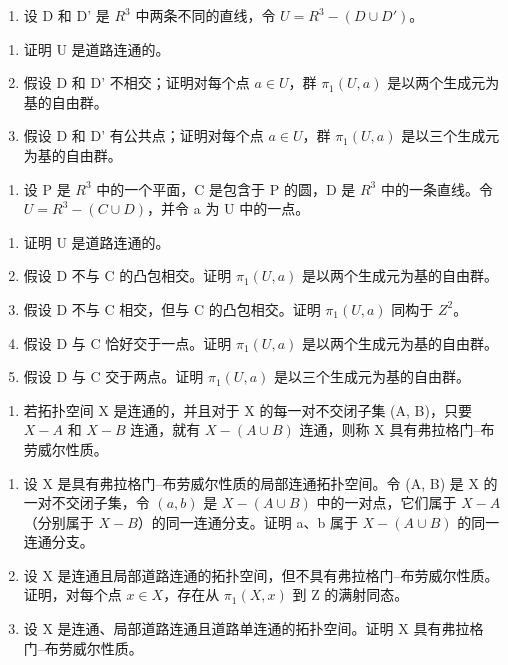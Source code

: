 \begin{enumerate}
\def\labelenumi{\arabic{enumi})}
\setcounter{enumi}{12}
\tightlist
\item
    设 D 和 D' 是 \(R^{3}\) 中两条不同的直线，令 \(U = R^{3} - (D \cup D')\)。
\end{enumerate}

\begin{enumerate}
\def\labelenumi{\alph{enumi})}
\item
  证明 U 是道路连通的。
\item
  假设 D 和 D' 不相交；证明对每个点 \(a \in U\)，群 \(\pi_{1}(U, a)\) 是以两个生成元为基的自由群。
\item
  假设 D 和 D' 有公共点；证明对每个点 \(a \in U\)，群 \(\pi_{1}(U, a)\) 是以三个生成元为基的自由群。
\end{enumerate}

\begin{enumerate}
\def\labelenumi{\arabic{enumi})}
\setcounter{enumi}{13}
\tightlist
\item
    设 P 是 \(R^{3}\) 中的一个平面，C 是包含于 P 的圆，D 是 \(R^{3}\) 中的一条直线。令 \(U = R^{3} - (C \cup D)\)，并令 a 为 U 中的一点。
\end{enumerate}

\begin{enumerate}
\def\labelenumi{\alph{enumi})}
\item
  证明 U 是道路连通的。
\item
  假设 D 不与 C 的凸包相交。证明 \(\pi_{1}(U,a)\) 是以两个生成元为基的自由群。
\item
  假设 D 不与 C 相交，但与 C 的凸包相交。证明 \(\pi_{1}(U,a)\) 同构于 \(Z^{2}\)。
\item
  假设 D 与 C 恰好交于一点。证明 \(\pi_{1}(U,a)\) 是以两个生成元为基的自由群。
\item
  假设 D 与 C 交于两点。证明 \(\pi_{1}(U,a)\) 是以三个生成元为基的自由群。
\end{enumerate}

\begin{enumerate}
\def\labelenumi{\arabic{enumi})}
\setcounter{enumi}{14}
\tightlist
\item
  若拓扑空间 X 是连通的，并且对于 X 的每一对不交闭子集 (A, B)，只要 \(X-A\) 和 \(X-B\) 连通，就有 \(X-(A \cup B)\) 连通，则称 X 具有弗拉格门–布劳威尔性质。
\end{enumerate}

\begin{enumerate}
\def\labelenumi{\alph{enumi})}
\item
  设 X 是具有弗拉格门–布劳威尔性质的局部连通拓扑空间。令 (A, B) 是 X 的一对不交闭子集，令 \((a, b)\) 是 \(X-(A \cup B)\) 中的一对点，它们属于 \(X-A\)（分别属于 \(X-B\)）的同一连通分支。证明 a、b 属于 \(X-(A \cup B)\) 的同一连通分支。
\item
  设 X 是连通且局部道路连通的拓扑空间，但不具有弗拉格门–布劳威尔性质。证明，对每个点 \(x \in X\)，存在从 \(\pi_{1}(X, x)\) 到 Z 的满射同态。
\item
  设 X 是连通、局部道路连通且道路单连通的拓扑空间。证明 X 具有弗拉格门–布劳威尔性质。
\end{enumerate}

